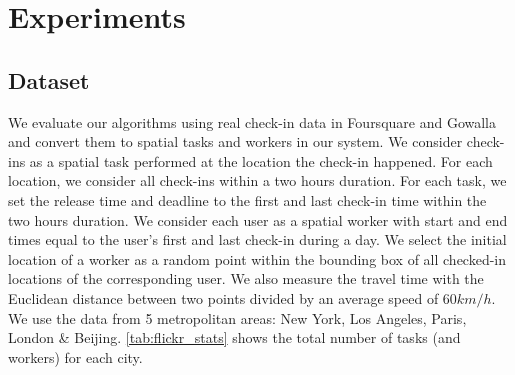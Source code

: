 \vspace{-0.05in}
\section{Experiments}
\label{sec:experiments}
\vspace{-0.05in}

\subsection{Dataset}
\label{subsec:dataset}
\vspace{-0.05in}
We evaluate our algorithms using real check-in data in Foursquare and Gowalla and convert them to spatial tasks and workers in our system. We consider check-ins as a spatial task performed at the location the check-in happened. For each location, we consider all check-ins within a two hours duration. For each task, we set the release time and deadline to the first and last check-in time within the two hours duration. We consider each user as a spatial worker with start and end times equal to the user's first and last check-in during a day. We select the initial location of a worker as a random point within the bounding box of all checked-in locations of the corresponding user. We also measure the travel time with the Euclidean distance between two points divided by an average speed of $60 km/h$. We use the data from 5 metropolitan areas: New York, Los Angeles, Paris, London \& Beijing. \cref{tab:flickr_stats} shows the total number of tasks (and workers) for each city.

